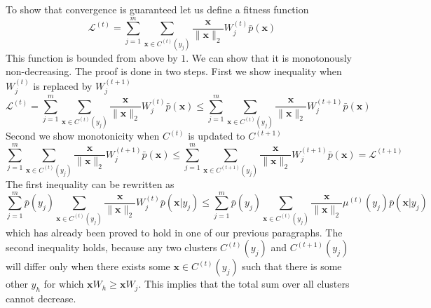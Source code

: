 \documentclass[12pt]{article}
\begin{document}
To show that convergence is guaranteed let us define a fitness function
\[
\mathcal{L}^{(t)} = \sum_{j=1}^m \sum_{\boldsymbol{x}\in C^{(t)}(y_j)} \frac{\boldsymbol{x}}{\lVert \boldsymbol{x} \rVert_2} W_j^{(t)} \bar{p}(\boldsymbol{x})
\] 
This function is bounded from above by $1$. We can show that it is monotonously non-decreasing. The proof is done in two steps. First we show inequality when $W_j^{(t)}$  is replaced by $W_j^{(t+1)}$
\[\mathcal{L}^{(t)}= \sum_{j=1}^m \sum_{\boldsymbol{x}\in C^{(t)}(y_j)} \frac{\boldsymbol{x}}{\lVert \boldsymbol{x} \rVert_2} W_j^{(t)} \bar{p}(\boldsymbol{x}) \le \sum_{j=1}^m \sum_{\boldsymbol{x}\in C^{(t)}(y_j)} \frac{\boldsymbol{x}}{\lVert \boldsymbol{x} \rVert_2} W_j^{(t+1)} \bar{p}(\boldsymbol{x})\] 
Second we show monotonicity when $C^{(t)}$ is updated to $C^{(t+1)}$
\[\sum_{j=1}^m \sum_{\boldsymbol{x}\in C^{(t)}(y_j)} \frac{\boldsymbol{x}}{\lVert \boldsymbol{x} \rVert_2} W_j^{(t+1)} \bar{p}(\boldsymbol{x}) \le \sum_{j=1}^m \sum_{\boldsymbol{x}\in C^{(t+1)}(y_j)} \frac{\boldsymbol{x}}{\lVert \boldsymbol{x} \rVert_2} W_j^{(t+1)} \bar{p}(\boldsymbol{x})=\mathcal{L}^{(t+1)}\] 
The first inequality can be rewritten as 
\[\sum_{j=1}^m \bar{p}(y_j)  \sum_{\boldsymbol{x}\in C^{(t)}(y_j)} \frac{\boldsymbol{x}}{\lVert \boldsymbol{x} \rVert_2} W_j^{(t)} \bar{p}(\boldsymbol{x}|y_j) \le \sum_{j=1}^m \bar{p}(y_j) \sum_{\boldsymbol{x}\in C^{(t)}(y_j)} \frac{\boldsymbol{x}}{\lVert \boldsymbol{x} \rVert_2} \mu^{(t)}(y_j) \bar{p}(\boldsymbol{x}|y_j)\] 
which has already been proved to hold in one of our previous paragraphs.
The second inequality holds, because any two clusters $C^{(t)}(y_j)$ and  $C^{(t+1)}(y_j)$ will differ only when there exists some $\boldsymbol{x}\in C^{(t)}(y_j)$ such that there is some other $y_h$ for which $\boldsymbol{x}W_h \ge \boldsymbol{x} W_j$. This implies that the total sum over all clusters cannot decrease.
\end{document}
